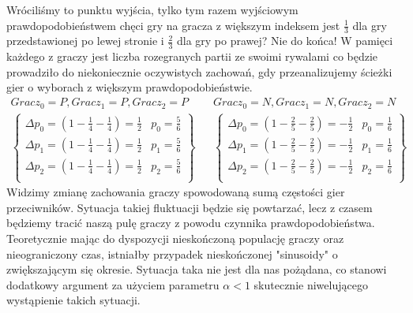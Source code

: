 Wróciliśmy to punktu wyjścia, tylko tym razem wyjściowym prawdopodobieństwem chęci gry na gracza z większym indeksem jest $\frac{1}{3}$ dla gry przedstawionej po lewej stronie i $\frac{2}{3}$ dla gry po prawej? Nie do końca! W pamięci każdego z graczy jest liczba rozegranych partii ze swoimi rywalami co będzie prowadziło do niekoniecznie oczywistych zachowań, gdy przeanalizujemy ścieżki gier o wyborach z większym prawdopodobieństwie.
\begin{align*}
Gracz_0 = P, Gracz_1 = P, Gracz_2 = P && Gracz_0 = N, Gracz_1 = N, Gracz_2 = N \\
\left\{
\begin{array}{ll}
\Delta p_0 = (1 - \frac{1}{4} - \frac{1}{4}) =  \frac{1}{2} & p_0= \frac{5}{6}\\
\Delta p_1 = (1 - \frac{1}{4} - \frac{1}{4}) =  \frac{1}{2} & p_1= \frac{5}{6}\\
\Delta p_2 = (1 - \frac{1}{4} - \frac{1}{4}) =  \frac{1}{2} & p_2= \frac{5}{6}\\
\end{array} 
\right\} &&
\left\{
\begin{array}{ll}
\Delta p_0 = (1 - \frac{2}{5} - \frac{2}{5}) =  -\frac{1}{2} & p_0= \frac{1}{6}\\
\Delta p_1 = (1 - \frac{2}{5} - \frac{2}{5}) =  -\frac{1}{2} & p_1= \frac{1}{6}\\
\Delta p_2 = (1 - \frac{2}{5} - \frac{2}{5}) =  -\frac{1}{2} & p_2= \frac{1}{6}\\
\end{array}
\right\}
\end{align*}
Widzimy zmianę zachowania graczy spowodowaną sumą częstości gier przeciwników. Sytuacja takiej fluktuacji będzie się powtarzać, lecz z czasem będziemy tracić naszą pulę graczy z powodu czynnika prawdopodobieństwa. Teoretycznie mając do dyspozycji nieskończoną populację graczy oraz nieograniczony czas, istniałby przypadek nieskończonej "sinusoidy" o zwiększającym się okresie. Sytuacja taka nie jest dla nas pożądana, co stanowi dodatkowy argument za użyciem parametru $\alpha < 1$ skutecznie niwelującego wystąpienie takich sytuacji.